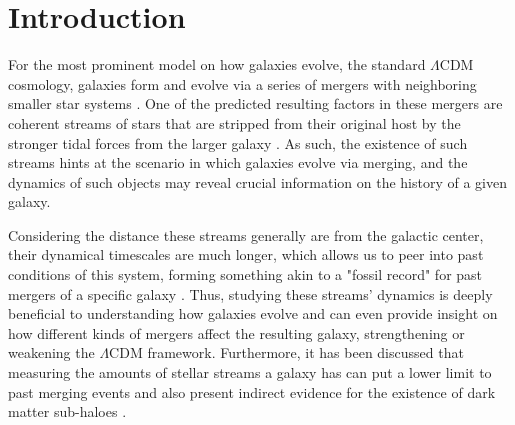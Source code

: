 \documentclass[linenumbers,trackchanges]{aastex7}
\begin{document}

\section{Introduction} \label{sec:introduction}

For the most prominent model on how galaxies evolve, the standard $\Lambda$CDM cosmology, galaxies form and evolve via a series of mergers with neighboring smaller star systems \citep{Johnston2008-bz}. One of the predicted resulting factors in these mergers are coherent streams of stars that are stripped from their original host by the stronger tidal forces from the larger galaxy \citep{Jensen2021-mw}. As such, the existence of such streams hints at the scenario in which galaxies evolve via merging, and the dynamics of such objects may reveal crucial information on the history of a given galaxy.

Considering the distance these streams generally are from the galactic center, their dynamical timescales are much longer, which allows us to peer into past conditions of this system, forming something akin to a "fossil record" for past mergers of a specific galaxy \citep{Johnston1996-uv}. Thus, studying these streams' dynamics is deeply beneficial to understanding how galaxies evolve and can even provide insight on how different kinds of mergers affect the resulting galaxy, strengthening or weakening the $\Lambda$CDM framework. Furthermore, it has been discussed that measuring the amounts of stellar streams a galaxy has can put a lower limit to past merging events and also present indirect evidence for the existence of dark matter sub-haloes \citep{Malhan2018-mh}.
\end{document}
